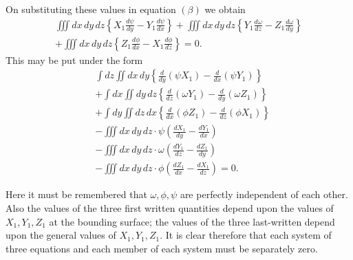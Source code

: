 \documentclass[11pt]{article}
\newcommand{\sourcepage}[1]{\marginpar{\scriptsize p.~#1}}
\begin{document}
On substituting these values in equation $(\beta)$ we obtain
\begin{multline*}
\iiint dx\,dy\,dz\left\{X_1\frac{d\psi}{dy}-Y_1\frac{d\psi}{dx}\right\}
+\iiint dx\,dy\,dz\left\{Y_1\frac{d\omega}{dz}-Z_1\frac{d\omega}{dy}\right\}\\
+\iiint dx\,dy\,dz\left\{Z_1\frac{d\phi}{dx}-X_1\frac{d\phi}{dz}\right\}=0.
\end{multline*}
This may be put under the form
\begin{align*}
&\int dz\iint dx\,dy\left\{\frac{d}{dy}(\psi X_1)-\frac{d}{dx}(\psi Y_1)\right\}\\
&+\int dx\iint dy\,dz\left\{\frac{d}{dz}(\omega Y_1)-\frac{d}{dy}(\omega Z_1)\right\}\\
&+\int dy\iint dz\,dx\left\{\frac{d}{dx}(\phi Z_1)-\frac{d}{dz}(\phi X_1)\right\}\\
&-\iiint dx\,dy\,dz\cdot\psi\left(\frac{dX_1}{dy}-\frac{dY_1}{dx}\right)\\
&-\iiint dx\,dy\,dz\cdot\omega\left(\frac{dY_1}{dz}-\frac{dZ_1}{dy}\right)\\
&-\iiint dx\,dy\,dz\cdot\phi\left(\frac{dZ_1}{dx}-\frac{dX_1}{dz}\right)=0.
\end{align*}

\sourcepage{31}
Here it must be remembered that $\omega,\phi,\psi$ are perfectly independent of each other. Also the values of the three first written quantities depend upon the values of $X_1,Y_1,Z_1$ at the bounding surface; the values of the three last-written depend upon the general values of $X_1,Y_1,Z_1$. It is clear therefore that each system of three equations and each member of each system must be separately zero.
\end{document}
